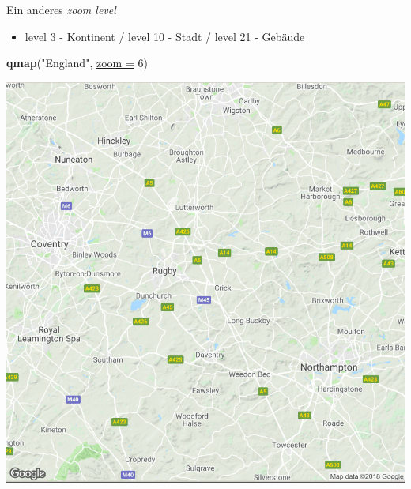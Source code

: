 \documentclass[ignorenonframetext,]{beamer}
\newenvironment{Shaded}{\begin{snugshade}}{\end{snugshade}}
\newcommand{\DataTypeTok}[1]{\textcolor[rgb]{0.74,0.68,0.62}{\underline{#1}}}
\newcommand{\DecValTok}[1]{\textcolor[rgb]{0.27,0.67,0.26}{#1}}
\newcommand{\KeywordTok}[1]{\textcolor[rgb]{0.26,0.66,0.93}{\textbf{#1}}}
\newcommand{\NormalTok}[1]{\textcolor[rgb]{0.74,0.68,0.62}{#1}}
\newcommand{\StringTok}[1]{\textcolor[rgb]{0.02,0.61,0.04}{#1}}
\providecommand{\tightlist}{%
  \setlength{\itemsep}{0pt}\setlength{\parskip}{0pt}}
\begin{document}
\begin{frame}[fragile]{Ein anderes \emph{zoom level}}
\protect\hypertarget{ein-anderes-zoom-level}{}

\begin{itemize}
\tightlist
\item
  level 3 - Kontinent / level 10 - Stadt / level 21 - Gebäude
\end{itemize}

\begin{Shaded}
\begin{Highlighting}[]
\KeywordTok{qmap}\NormalTok{(}\StringTok{"England"}\NormalTok{, }\DataTypeTok{zoom =} \DecValTok{6}\NormalTok{)}
\end{Highlighting}
\end{Shaded}

\includegraphics{figure/EnglandMap.PNG}

\end{frame}
\end{document}
